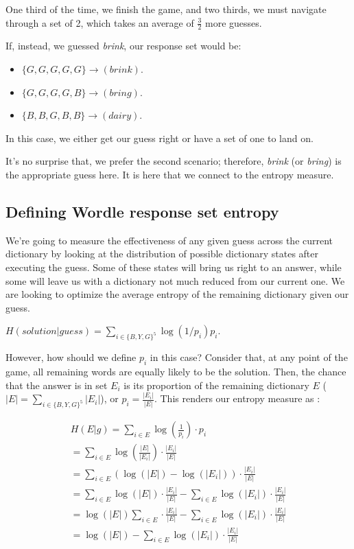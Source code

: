 \documentclass[11pt, oneside]{article} 	%
\begin{document}
One third of the time, we finish the game, and two thirds, we must navigate through a set of 2, which takes an average of $\frac{3}{2}$ more guesses. 

If, instead, we guessed \emph{brink}, our response set would be:
\begin{itemize}
\item $\{G, G, G, G, G\} \rightarrow (brink)$.
\item $\{G, G, G, G, B\} \rightarrow (bring)$.
\item $\{B, B, G, B, B\} \rightarrow (dairy)$.
\end{itemize}

In this case, we either get our guess right or have a set of one to land on.

It's no surprise that, we prefer the second scenario; therefore, \emph{brink} (or \emph{bring}) is the appropriate guess here. It is here that we connect to the entropy measure.

\subsection{Defining Wordle response set entropy}

We're going to measure the effectiveness of any given guess across the current dictionary by looking at the distribution of possible dictionary states after executing the guess. Some of these states will bring us right to an answer, while some will leave us with a dictionary not much reduced from our current one. We are looking to optimize the average entropy of the remaining dictionary given our guess.

\begin{center}
$H(solution | guess) = \sum_{i \in \{B, Y, G\}^5} \log(1/ p_i) p_i$.
\end{center}

However, how should we define $p_i$ in this case? Consider that, at any point of the game, all remaining words are equally likely to be the solution. Then, the chance that the answer is in set $E_i$ is its proportion of the remaining dictionary $E$ ($|E| =\sum_{i \in \{B, Y, G\}^5} |E_i|$), or $p_i = \frac{|E_i|}{|E|}$. This renders our entropy measure as :

\begin{align}
H(E | g) = \sum_{i \in E} \log(\frac{1}{p_i}) \cdot p_i \\
= \sum_{i \in E} \log(\frac{|E|}{|E_i|}) \cdot \frac{|E_i|}{|E|} \\
= \sum_{i \in E} (\log(|E|) - \log(|E_i|)) \cdot \frac{|E_i|}{|E|} \\
= \sum_{i \in E} \log(|E|) \cdot \frac{|E_i|}{|E|} - \sum_{i \in E}\log(|E_i|) \cdot \frac{|E_i|}{|E|} \\
= \log(|E|) \sum_{i \in E} \cdot \frac{|E_i|}{|E|} - \sum_{i \in E}\log(|E_i|) \cdot \frac{|E_i|}{|E|} \\
= \log(|E|) - \sum_{i \in E}\log(|E_i|) \cdot \frac{|E_i|}{|E|}
\end{align}
\end{document}
